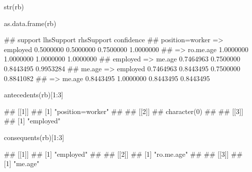 \documentclass{article}\usepackage[]{graphicx}\usepackage[]{color}
\begin{document}
\begin{Schunk}
% --begin: "searchrules2"
\begin{Sinput}
str(rb)
\end{Sinput}
%
% --end: "searchrules2"
\end{Schunk}

\begin{Schunk}
% --begin: "searchrules3"
\begin{Sinput}
as.data.frame(rb)
\end{Sinput}
\begin{Soutput}
##                               support lhsSupport rhsSupport confidence
## position=worker => employed 0.5000000  0.5000000  0.7500000  1.0000000
##  => ro.me.age               1.0000000  1.0000000  1.0000000  1.0000000
## employed => me.age          0.7464963  0.7500000  0.8443495  0.9953284
## me.age => employed          0.7464963  0.8443495  0.7500000  0.8841082
##  => me.age                  0.8443495  1.0000000  0.8443495  0.8443495
\end{Soutput}
%
% --end: "searchrules3"
\end{Schunk}

\begin{Schunk}
% --begin: "searchrules4"
\begin{Sinput}
antecedents(rb)[1:3]
\end{Sinput}
\begin{Soutput}
## [[1]]
## [1] "position=worker"
## 
## [[2]]
## character(0)
## 
## [[3]]
## [1] "employed"
\end{Soutput}
\begin{Sinput}
consequents(rb)[1:3]
\end{Sinput}
\begin{Soutput}
## [[1]]
## [1] "employed"
## 
## [[2]]
## [1] "ro.me.age"
## 
## [[3]]
## [1] "me.age"
\end{Soutput}
%
% --end: "searchrules4"
\end{Schunk}
\end{document}

